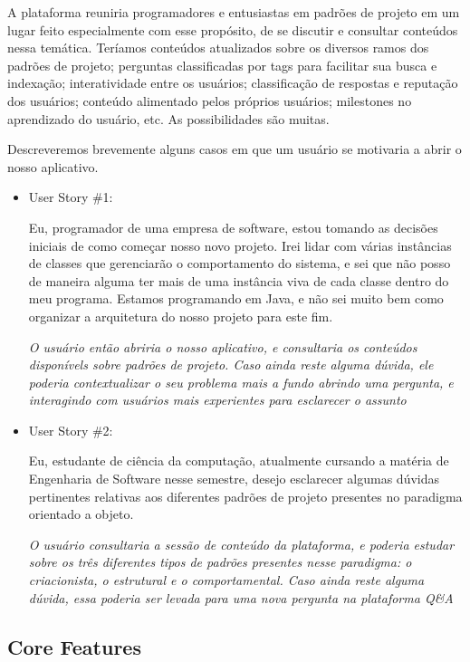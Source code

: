 A plataforma reuniria programadores e entusiastas em padrões de projeto em um lugar feito especialmente com esse propósito, de se discutir e consultar conteúdos nessa temática. Teríamos conteúdos atualizados sobre os diversos ramos dos padrões de projeto; perguntas classificadas por tags para facilitar sua busca e indexação; interatividade entre os usuários; classificação de respostas e reputação dos usuários; conteúdo alimentado pelos próprios usuários; milestones no aprendizado do usuário, etc. As possibilidades são muitas.

Descreveremos brevemente alguns casos em que um usuário se motivaria a abrir o nosso aplicativo.

\begin{itemize}
	\item User Story \#1: 

	Eu, programador de uma empresa de software, estou tomando as decisões iniciais de como começar nosso novo projeto. Irei lidar com várias instâncias de classes que gerenciarão o comportamento do sistema, e sei que não posso de maneira alguma ter mais de uma instância viva de cada classe dentro do meu programa. Estamos programando em Java, e não sei muito bem como organizar a arquitetura do nosso projeto para este fim.

	\textit{O usuário então abriria o nosso aplicativo, e consultaria os conteúdos disponívels sobre padrões de projeto. Caso ainda reste alguma dúvida, ele poderia contextualizar o seu problema mais a fundo abrindo uma pergunta, e interagindo com usuários mais experientes para esclarecer o assunto}

\newpage
	\item User Story \#2: 

	Eu, estudante de ciência da computação, atualmente cursando a matéria de Engenharia de Software nesse semestre, desejo esclarecer algumas dúvidas pertinentes relativas aos diferentes padrões de projeto presentes no paradigma orientado a objeto.

	\textit{O usuário consultaria a sessão de conteúdo da plataforma, e poderia estudar sobre os três diferentes tipos de padrões presentes nesse paradigma: o criacionista, o estrutural e o comportamental. Caso ainda reste alguma dúvida, essa poderia ser levada para uma nova pergunta na plataforma Q\&A}
\end{itemize}



\subsection{Core Features}

